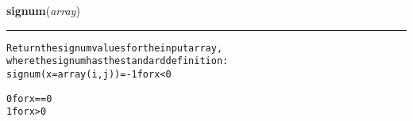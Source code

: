     \label{multireg:edge_detect:signum}
    \vspace{0.5ex}

    \begin{boxedminipage}{\textwidth}

    \raggedright \textbf{signum}(\textit{array})

    \vspace{-1.5ex}

    \rule{\textwidth}{0.5\fboxrule}
\begin{alltt}
Return the signum values for the input array,
where the signum has the standard definition:
    signum(x = array(i,j)) = -1 for x {\textless} 0

                              0 for x == 0
                              1 for x {\textgreater} 0\end{alltt}

    \vspace{1ex}

    \end{boxedminipage}

